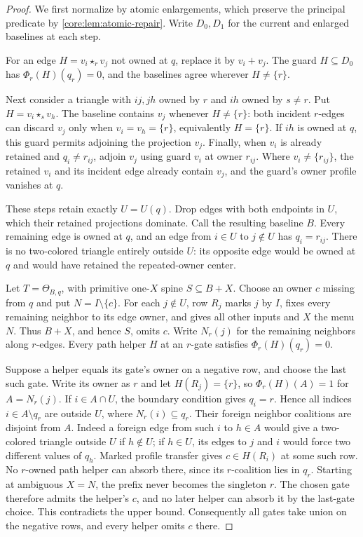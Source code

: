 \begin{proof}
We first normalize by atomic enlargements, which preserve the principal
predicate by \cref{core:lem:atomic-repair}. Write $D_0,D_1$ for
the current and enlarged baselines at each step.

For an edge $H=v_i\star_r v_j$ not owned at $q$, replace it by
$v_i+v_j$. The guard $H\subseteq D_0$ has
$\Phi_r(H)(q_r)=0$, and the baselines agree wherever $H\ne\{r\}$.

Next consider a triangle with $ij,jh$ owned by $r$ and $ih$
owned by $s\ne r$. Put $H=v_i\star_s v_h$. The baseline
contains $v_j$ whenever $H\ne\{r\}$: both incident $r$-edges
can discard $v_j$ only when $v_i=v_h=\{r\}$, equivalently
$H=\{r\}$. If $ih$ is owned at $q$, this guard permits
adjoining the projection $v_j$.
Finally, when $v_i$ is already retained and $q_i\ne r_{ij}$,
adjoin $v_j$ using guard $v_i$ at owner $r_{ij}$.
Where $v_i\ne\{r_{ij}\}$, the retained $v_i$ and its incident
edge already contain $v_j$, and the guard's owner profile vanishes at $q$.

These steps retain exactly $U=U(q)$. Drop edges with both
endpoints in $U$, which their retained projections dominate.
Call the resulting baseline $B$. Every remaining edge is owned
at $q$, and an edge from $i\in U$ to $j\notin U$ has
$q_i=r_{ij}$. There is no two-colored triangle entirely outside
$U$: its opposite edge would be owned at $q$ and would have
retained the repeated-owner center.

Let $T=\Theta_{B,q}$, with primitive one-$X$ spine $S\subseteq B+X$.
Choose an owner $c$ missing from $q$ and put $N=I\setminus\{c\}$.
For each $j\notin U$, row $R_j$ marks $j$ by $I$, fixes every
remaining neighbor to its edge owner, and gives all other inputs
and $X$ the menu $N$. Thus $B+X$, and hence $S$, omits $c$.
Write $N_r(j)$ for the remaining neighbors along $r$-edges.
Every path helper $H$ at an $r$-gate satisfies
$\Phi_r(H)(q_r)=0$.

Suppose a helper equals its gate's owner on a negative row, and
choose the last such gate. Write its owner as $r$ and let
$H(R_j)=\{r\}$, so $\Phi_r(H)(A)=1$ for $A=N_r(j)$.
If $i\in A\cap U$, the boundary condition gives $q_i=r$.
Hence all indices $i\in A\setminus q_r$ are outside $U$, where
$N_r(i)\subseteq q_r$. Their foreign neighbor coalitions are
disjoint from $A$. Indeed a foreign edge from such $i$ to
$h\in A$ would give a two-colored triangle outside $U$ if
$h\notin U$; if $h\in U$, its edges to $j$ and $i$ would
force two different values of $q_h$.
Marked profile transfer gives $c\in H(R_i)$ at some such row.
No $r$-owned path helper can absorb there, since its $r$-coalition
lies in $q_r$. Starting at ambiguous $X=N$, the prefix never
becomes the singleton $r$. The chosen gate therefore admits
the helper's $c$, and no later helper can absorb it by the
last-gate choice. This contradicts the upper bound.
Consequently all gates take union on the negative rows, and every
helper omits $c$ there.


\end{proof}
